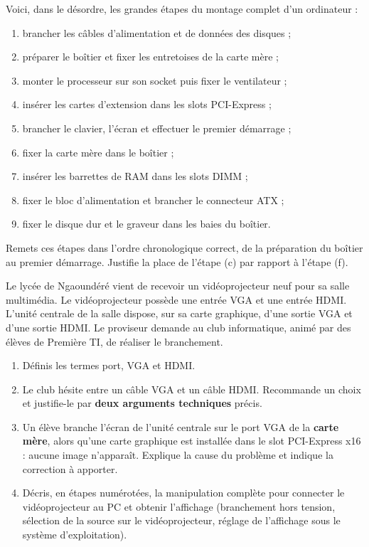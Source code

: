\documentclass[11pt]{article}
\newcommand{\cle}[1]{{\popxbold\color{popdark}#1}}
\newcounter{popsec}
\newcounter{popsub}
\newcommand{\courssub}[1]{%
  \stepcounter{popsub}%
  \par\vspace{9pt}\noindent{\popxbold\fontsize{11.5}{13}\selectfont\color{popink}{\color{poporange}\thepopsec.\thepopsub}\hspace{6pt}#1}\par\nopagebreak\vspace{4pt}
}
\begin{document}
\begin{exercice}
Voici, dans le désordre, les grandes étapes du montage complet d'un ordinateur :
\begin{enumerate}
  \item[a)] brancher les câbles d'alimentation et de données des disques ;
  \item[b)] préparer le boîtier et fixer les entretoises de la carte mère ;
  \item[c)] monter le processeur sur son socket puis fixer le ventilateur ;
  \item[d)] insérer les cartes d'extension dans les slots PCI-Express ;
  \item[e)] brancher le clavier, l'écran et effectuer le premier démarrage ;
  \item[f)] fixer la carte mère dans le boîtier ;
  \item[g)] insérer les barrettes de RAM dans les slots DIMM ;
  \item[h)] fixer le bloc d'alimentation et brancher le connecteur ATX ;
  \item[i)] fixer le disque dur et le graveur dans les baies du boîtier.
\end{enumerate}
Remets ces étapes dans l'ordre chronologique correct, de la préparation du boîtier au premier démarrage. Justifie la place de l'étape (c) par rapport à l'étape (f).
\end{exercice}

\courssub{Je me prépare au Probatoire}

\begin{exercice}
Le lycée de Ngaoundéré vient de recevoir un vidéoprojecteur neuf pour sa salle multimédia. Le vidéoprojecteur possède une entrée VGA et une entrée HDMI. L'unité centrale de la salle dispose, sur sa carte graphique, d'une sortie VGA et d'une sortie HDMI. Le proviseur demande au club informatique, animé par des élèves de Première TI, de réaliser le branchement.
\begin{enumerate}
  \item Définis les termes \cle{port}, \cle{VGA} et \cle{HDMI}.
  \item Le club hésite entre un câble VGA et un câble HDMI. Recommande un choix et justifie-le par \textbf{deux arguments techniques} précis.
  \item Un élève branche l'écran de l'unité centrale sur le port VGA de la \textbf{carte mère}, alors qu'une carte graphique est installée dans le slot PCI-Express x16 : aucune image n'apparaît. Explique la cause du problème et indique la correction à apporter.
  \item Décris, en étapes numérotées, la manipulation complète pour connecter le vidéoprojecteur au PC et obtenir l'affichage (branchement hors tension, sélection de la source sur le vidéoprojecteur, réglage de l'affichage sous le système d'exploitation).
\end{enumerate}
\end{exercice}
\end{document}
